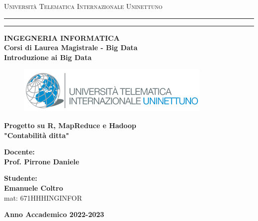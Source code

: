 \begin{titlepage}
    \begin{center}
    {{\Large{\textsc{Università Telematica Internazionale Uninettuno}}}} \rule[0.1cm]{14cm}{0.1mm}
    \rule[0.5cm]{14cm}{0.6mm}
    
    
    {\small{\bf INGEGNERIA INFORMATICA \\Corsi di Laurea Magistrale - Big Data\\}}
    \vspace{6mm}
    {\LARGE{\bf Introduzione ai Big Data}}
    
    \end{center}
    \begin{figure}[H]
        \centering
        \includegraphics[scale=.5]{img/logoUni.png}
    \end{figure}
    \vspace{15mm}
    
    \begin{center}
    {\LARGE{\bf Progetto su R, MapReduce e Hadoop}}\\
    \vspace{3mm}
    {\large{\bf "Contabilità ditta"}}\\
    \vspace{3mm}
    \end{center}
    \vspace{40mm}
    \par
    \noindent
    \begin{minipage}[t]{0.47\textwidth}
    {\large{\bf Docente:\\
    Prof. Pirrone Daniele}}
    \end{minipage}
    \hfill
    \begin{minipage}[t]{0.47\textwidth}\raggedleft
    {\large{\bf Studente:\\
    Emanuele Coltro\\
    }}
    mat: 671HHHINGINFOR
    \end{minipage}
    \vspace{20mm}
    \begin{center}
    {\large{\bf
    Anno Accademico 2022-2023}}%
    \end{center}
    \end{titlepage}